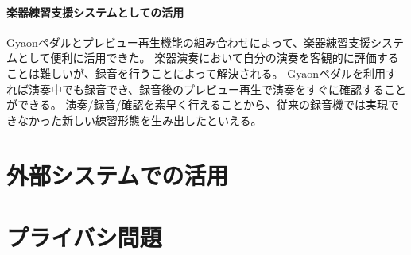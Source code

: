 \paragraph{楽器練習支援システムとしての活用}
Gyaonペダルとプレビュー再生機能の組み合わせによって、楽器練習支援システムとして便利に活用できた。
楽器演奏において自分の演奏を客観的に評価することは難しいが、録音を行うことによって解決される。
Gyaonペダルを利用すれば演奏中でも録音でき、録音後のプレビュー再生で演奏をすぐに確認することができる。
演奏/録音/確認を素早く行えることから、従来の録音機では実現できなかった新しい練習形態を生み出したといえる。



\section{外部システムでの活用}
%
%
%

\section{プライバシ問題}
